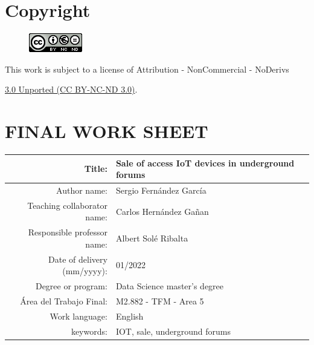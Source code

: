 \setcounter{page}{1} 
\pagestyle{plain}

\chapter*{Copyright}
\vspace{1cm}

\begin{figure}[ht]
    \centering
	\includegraphics[scale=1]{images/license.png}
\end{figure}

This work is subject to a license of Attribution - NonCommercial - NoDerivs

\href{https://creativecommons.org/licenses/by-nc-nd/3.0/}{3.0 Unported (CC BY-NC-ND 3.0)}.

\chapter*{FINAL WORK SHEET}

\begin{table}[ht]
	\centering{}
	\renewcommand{\arraystretch}{2}
	\begin{tabular}{r | l}
		\hline
		Title: & Sale of access IoT devices in underground forums\\
		\hline
        Author name: & Sergio Fernández García\\
		\hline
        Teaching collaborator name: & Carlos Hernández Gañan\\
		\hline
        Responsible professor name: & Albert Solé Ribalta\\
		\hline
        Date of delivery (mm/yyyy): & 01/2022\\
		\hline
        Degree or program: & Data Science master's degree\\
		\hline
        Área del Trabajo Final: & M2.882 - TFM - Area 5\\
		\hline
        Work language: & English\\
		\hline
        keywords: & IOT, sale, underground forums\\
		\hline
	\end{tabular}
\end{table}

